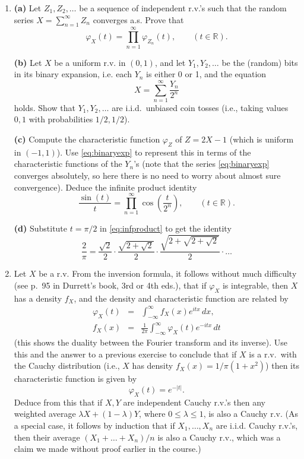 \documentclass[12pt]{article}
\newcommand{\R}{\mathbb{R}}
\theoremstyle{example}
\begin{document}
\begin{enumerate}
\medskip \noindent
\textbf{(b)} Show that $X$ is equal in distribution to $-X$ if and only if $\varphi_X$ is a real-valued function.


\item
\textbf{(a)} Let $Z_1,Z_2,\ldots$ be a sequence of independent r.v.'s such that the random series
$ X = \sum_{n=1}^\infty Z_n$
converges a.s. Prove that
$$ \varphi_X(t) = \prod_{n=1}^\infty \varphi_{Z_n}(t), \qquad (t\in \R). $$

\medskip\noindent
\textbf{(b)} Let $X$ be a uniform r.v. in $(0,1)$, and let $Y_1, Y_2, \ldots$ be the (random) bits in its binary expansion, i.e. each $Y_n$ is either 0 or 1, and the equation
\begin{equation} \label{eq:binaryexp}
X = \sum_{n=1}^\infty \frac{Y_n}{2^n}
\end{equation}
holds. Show that $Y_1, Y_2, \ldots$ are i.i.d.\ unbiased coin tosses (i.e., taking values $0,1$ with probabilities $1/2,1/2$).

\medskip\noindent
\textbf{(c)} Compute the characteristic function $\varphi_Z$ of $Z=2X-1$ (which is uniform in $(-1,1)$). Use \eqref{eq:binaryexp} to represent this in terms of the characteristic functions of the $Y_n$'s
(note that the series \eqref{eq:binaryexp} converges absolutely, so here there is no need to worry about almost sure convergence). Deduce the infinite product identity
\begin{equation}
\label{eq:infproduct}
\frac{\sin(t)}{t} = \prod_{n=1}^\infty \cos\left(\frac{t}{2^n} \right), \qquad (t\in \R).
\end{equation}

\medskip\noindent
\textbf{(d)} Substitute $t=\pi/2$ in \eqref{eq:infproduct} to get the identity
$$ \frac{2}{\pi} = \frac{\sqrt{2}}{2}\cdot \frac{\sqrt{2+\sqrt{2}}}{2} \cdot \frac{\sqrt{2+\sqrt{2+\sqrt{2}}}}{2} \cdot \ldots
$$

\item Let $X$ be a r.v. From the inversion formula, it follows without much difficulty (see p.~95 in Durrett's book, 3rd or 4th eds.), that if $\varphi_X$ is integrable, then $X$ has a density $f_X$, and the density and characteristic function are related by
\begin{eqnarray*} \varphi_X(t) &=& \int_{-\infty}^\infty f_X(x) e^{itx}\,dx,  \\
f_X(x) &=& \frac{1}{2\pi} \int_{-\infty}^\infty \varphi_X(t) e^{-itx}\,dt
\end{eqnarray*}
(this shows the duality between the Fourier transform and its inverse). Use this and the answer to a previous exercise to conclude that if $X$ is a r.v.\ with the Cauchy distribution (i.e., $X$ has density $f_X(x)=1/\pi(1+x^2)$) then its characteristic function is given by
$$ \varphi_X(t) = e^{-|t|}. $$
Deduce from this that if $X,Y$ are independent Cauchy r.v.'s then any weighted average $\lambda X+(1-\lambda)Y$, where $0\le \lambda\le 1$, is also a Cauchy r.v. (As a special case, it follows by induction that if
$X_1,\ldots,X_n$ are i.i.d. Cauchy r.v.'s, then their average $(X_1+\ldots+X_n)/n$ is also a Cauchy r.v., which was a claim we made without proof earlier in the course.)

\end{enumerate}
\end{document}
